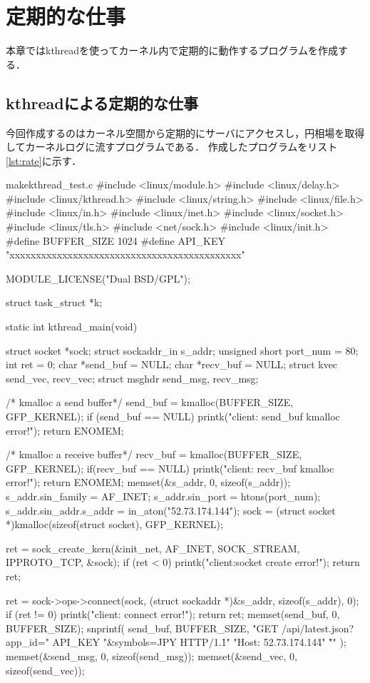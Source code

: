 \chapter{定期的な仕事}
本章ではkthreadを使ってカーネル内で定期的に動作するプログラムを作成する．

\section{kthreadによる定期的な仕事}
今回作成するのはカーネル空間から定期的にサーバにアクセスし，円相場を取得してカーネルログに流すプログラムである．
作成したプログラムをリスト\ref{lst:rate}に示す．
\begin{longlisting}
\begin{myminted}{make}{kthread_test.c}
#include <linux/module.h>
#include <linux/delay.h>
#include <linux/kthread.h>
#include <linux/string.h>
#include <linux/file.h>
#include <linux/in.h>
#include <linux/inet.h>
#include <linux/socket.h>
#include <linux/tls.h>
#include <net/sock.h>
#include <linux/init.h>
#define BUFFER_SIZE 1024
#define API_KEY "xxxxxxxxxxxxxxxxxxxxxxxxxxxxxxxxxxxxxxxxxxxx"

MODULE_LICENSE("Dual BSD/GPL");

struct task_struct *k;

static int kthread_main(void) {
    struct socket *sock;
    struct sockaddr_in s_addr;
    unsigned short port_num = 80;
    int ret = 0;
    char *send_buf = NULL;
    char *recv_buf = NULL;
    struct kvec send_vec, recv_vec;
    struct msghdr send_msg, recv_msg;

    /* kmalloc a send buffer*/
    send_buf = kmalloc(BUFFER_SIZE, GFP_KERNEL);
    if (send_buf == NULL) {
        printk("client: send_buf kmalloc error!\n");
        return ENOMEM;
    }

    /* kmalloc a receive buffer*/
    recv_buf = kmalloc(BUFFER_SIZE, GFP_KERNEL);
    if(recv_buf == NULL){
        printk("client: recv_buf kmalloc error!\n");
        return ENOMEM;
    }
    memset(&s_addr, 0, sizeof(s_addr));
    s_addr.sin_family = AF_INET;
    s_addr.sin_port = htons(port_num);
    s_addr.sin_addr.s_addr = in_aton("52.73.174.144");
    sock = (struct socket *)kmalloc(sizeof(struct socket), GFP_KERNEL);

    ret = sock_create_kern(&init_net, AF_INET, SOCK_STREAM, IPPROTO_TCP, &sock);
    if (ret < 0) {
        printk("client:socket create error!\n");
        return ret;
    } 

    ret = sock->ops->connect(sock, (struct sockaddr *)&s_addr, sizeof(s_addr), 0);
    if (ret != 0) {
        printk("client: connect error!\n");
        return ret;
    }
    memset(send_buf, 0, BUFFER_SIZE);
    snprintf(
        send_buf,
        BUFFER_SIZE,
        "GET /api/latest.json?app_id="
        API_KEY
        "&symbols=JPY HTTP/1.1\r\n"
        "Host: 52.73.174.144\r\n"
        "\r\n"
    );
    memset(&send_msg, 0, sizeof(send_msg));
    memset(&send_vec, 0, sizeof(send_vec));

}
\end{myminted}
\end{longlisting}
